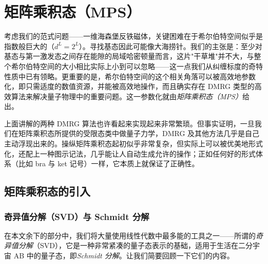 \section{矩阵乘积态（MPS）}
\label{sec:matrixproductstates}

考虑我们的范式问题——一维海森堡反铁磁体，关键困难在于希尔伯特空间似乎是指数般巨大的（$d^L = 2^L$）。寻找基态因此可能像大海捞针。我们的主张是：至少对基态与第一激发态之间存在能隙的局域哈密顿量而言，这片"干草堆"并不大，与整个希尔伯特空间的大小相比实际上小到可以忽略——这一点我们从纠缠标度的奇特性质中已有领略。更重要的是，希尔伯特空间的这个相关角落可以被高效地参数化，即只需适度的数值资源，并能被高效地操作，而且确实存在 DMRG 类型的高效算法来解决量子物理中的重要问题。这一参数化就由{\em 矩阵乘积态（MPS）}给出。

上面讲解的两种 DMRG 算法也许看起来实现起来非常繁琐。但事实证明，一旦我们在矩阵乘积态所提供的受限态类中做量子力学，DMRG 及其他方法几乎是自己主动浮现出来的。操纵矩阵乘积态起初似乎非常复杂，但实际上可以被优美地形式化，还配上一种图示记法，几乎能让人自动生成允许的操作；正如任何好的形式体系（比如 bra 与 ket 记号）一样，它本质上就保证了正确性。

\subsection{矩阵乘积态的引入}

\subsubsection{奇异值分解（SVD）与 Schmidt 分解}
在本文余下的部分中，我们将大量使用线性代数中最多能的工具之一——所谓的{\em 奇异值分解}（SVD），它是一种非常紧凑的量子态表示的基础，适用于生活在二分宇宙 AB 中的量子态，即{\em Schmidt 分解}。让我们简要回顾一下它们的内容。

